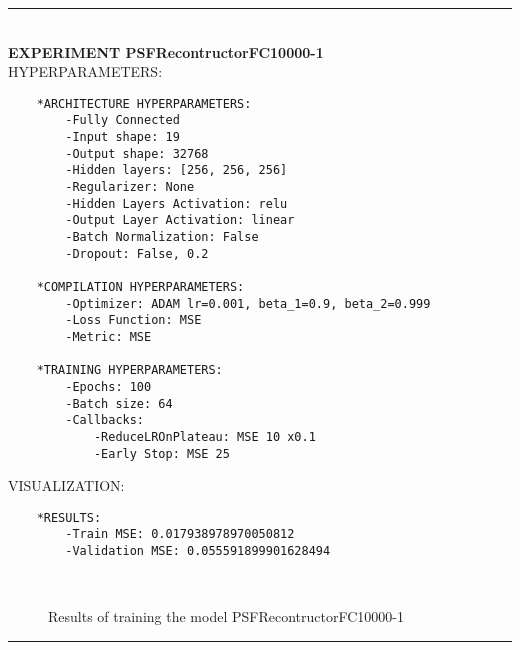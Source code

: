 \rule{0.5\textwidth}{0.5pt}\\

	{\large \textbf{EXPERIMENT PSFRecontructorFC10000-1}}\\
	
	{\normalsize HYPERPARAMETERS:}
	\begin{lstlisting}
	*ARCHITECTURE HYPERPARAMETERS:
		-Fully Connected
		-Input shape: 19
		-Output shape: 32768
		-Hidden layers: [256, 256, 256]
		-Regularizer: None
		-Hidden Layers Activation: relu
		-Output Layer Activation: linear
		-Batch Normalization: False
		-Dropout: False, 0.2
	
	*COMPILATION HYPERPARAMETERS:
		-Optimizer: ADAM lr=0.001, beta_1=0.9, beta_2=0.999
		-Loss Function: MSE
		-Metric: MSE
	
	*TRAINING HYPERPARAMETERS:
		-Epochs: 100
		-Batch size: 64
		-Callbacks: 
			-ReduceLROnPlateau: MSE 10 x0.1
			-Early Stop: MSE 25
	\end{lstlisting}
	
	{\normalsize VISUALIZATION:}
	\begin{lstlisting}
    *RESULTS:
        -Train MSE: 0.017938978970050812
        -Validation MSE: 0.055591899901628494
	\end{lstlisting}
	
	\begin{figure*}[ht!]
		\hspace{\fill}
		\hspace{\fill}	
		\\
		\caption{Results of training the model PSFRecontructorFC10000-1}
	\end{figure*}
	
\FloatBarrier	
\rule{0.5\textwidth}{0.5pt}\\